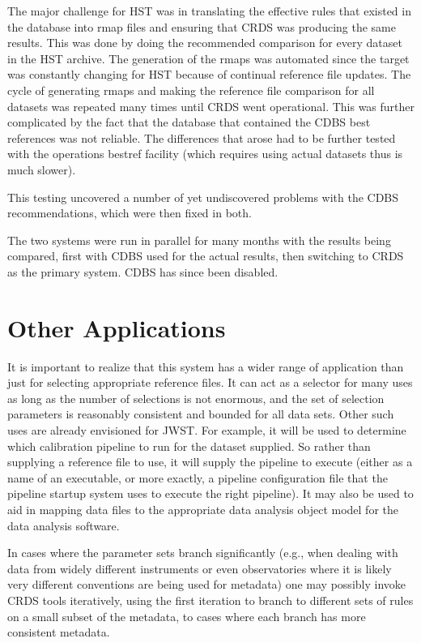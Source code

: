 \documentclass[final,authoryear,5p,times,twocolumn]{elsarticle}
\begin{document}
The major challenge for HST was in translating the effective rules that existed
in the database into rmap files and ensuring that CRDS was producing the same
results. This was done by doing the recommended comparison for every dataset
in the HST archive. The generation of the rmaps was automated since the target
was constantly changing for HST because of continual reference file
updates. The cycle of generating rmaps and making the reference file comparison
for all datasets was repeated many times until CRDS went operational. This was
further complicated by the fact that the database that contained the CDBS best
references was not reliable. The differences that arose had to be further
tested with the operations bestref facility (which requires using actual
datasets thus is much slower).

This testing uncovered a number of yet undiscovered problems with the CDBS
recommendations, which were then fixed in both.

The two systems were run in parallel for many months with the results being
compared, first with CDBS used for the actual results, then switching to CRDS
as the primary system. CDBS has since been disabled.

\section{Other Applications}

It is important to realize that this system has a wider range of application
than just for selecting appropriate reference files. It can act as a selector
for many uses as long as the number of selections is not enormous, and the set of
selection parameters is reasonably consistent and bounded for all data
sets. Other such uses are already envisioned for JWST. For example, it will be used
to determine which calibration pipeline to run for the dataset supplied. 
So rather than supplying a reference file to use, it will supply the pipeline 
to execute (either as a name of an executable, or more exactly, a pipeline 
configuration file that the pipeline startup system uses to execute the right
pipeline). It may also be
used to aid in mapping data files to the appropriate data analysis object model
for the data analysis software.

In cases where the parameter sets branch significantly (e.g., when dealing with
data from widely different instruments or even observatories where it is likely
very different conventions are being used for metadata) one may possibly invoke
CRDS tools iteratively, using the first iteration to branch to different sets of
rules on a small subset of the metadata, to cases where each branch has more
consistent metadata.
\end{document}
